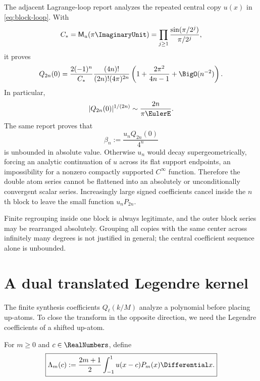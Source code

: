 \documentclass[11pt,oneside]{article}
\numberwithin{equation}{section}
\theoremstyle{definition}
\theoremstyle{remark}
\newcommand{\MM}{\mathsf M}
\begin{document}
The adjacent Lagrange-loop report analyzes the repeated central copy $u(x)$ in
\eqref{eq:block-loop}.  With
\begin{equation}
 C_*=\MM_u(\pi\ImaginaryUnit)
 =\prod_{j\ge1}\frac{\sin(\pi/2^j)}{\pi/2^j},
 \label{eq:Cstar}
\end{equation}
it proves
\begin{equation}
 Q_{2n}(0)=
 \frac{2(-1)^n}{C_*}\frac{(4n)!}{(2n)!(4\pi)^{2n}}
 \left(1+\frac{2\pi^2}{4n-1}+\BigO(n^{-2})\right).
 \label{eq:Q0-asymptotic}
\end{equation}
In particular,
\begin{equation}
 |Q_{2n}(0)|^{1/(2n)}\sim\frac{2n}{\pi\EulerE}.
 \label{eq:Q0-root}
\end{equation}
The same report proves that
\begin{equation}
 \beta_n:=\frac{u_nQ_{2n}(0)}{4^n}
 \label{eq:central-beta}
\end{equation}
is unbounded in absolute value.  Otherwise $u_n$ would decay
supergeometrically, forcing an analytic continuation of $u$ across its flat
support endpoints, an impossibility for a nonzero compactly supported
$C^\infty$ function.  Therefore the double atom series cannot be flattened
into an absolutely or unconditionally convergent scalar series.  Increasingly
large signed coefficients cancel inside the $n$th block to leave the small
function $u_nP_{2n}$.

\begin{warning}
Finite regrouping inside one block is always legitimate, and the outer block
series may be rearranged absolutely.  Grouping all copies with the same center
across infinitely many degrees is not justified in general; the central
coefficient sequence alone is unbounded.
\end{warning}

\section{A dual translated Legendre kernel}
\label{sec:dual-kernel}

The finite synthesis coefficients $Q_\ell(k/M)$ analyze a polynomial before
placing up-atoms.  To close the transform in the opposite direction, we need
the Legendre coefficients of a shifted up-atom.

\begin{definition}
\label{def:Lambda}
For $m\ge0$ and $c\in\RealNumbers$, define
\begin{equation}
 \boxed{
 \Lambda_m(c):=\frac{2m+1}{2}
 \int_{-1}^{1}u(x-c)P_m(x)\Differential x.}
 \label{eq:Lambda-def}
\end{equation}
\end{definition}
\end{document}
